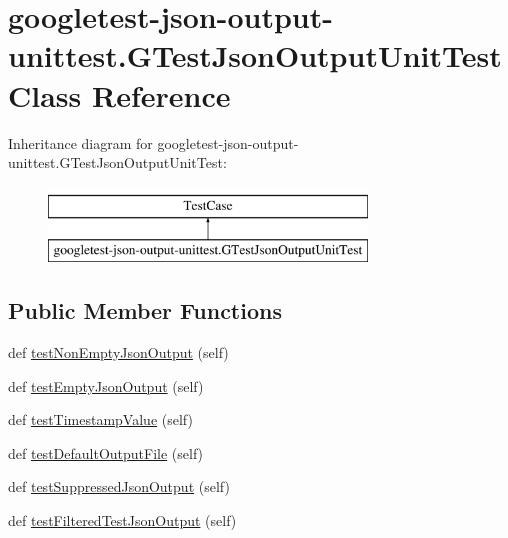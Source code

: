 \hypertarget{classgoogletest-json-output-unittest_1_1GTestJsonOutputUnitTest}{}\section{googletest-\/json-\/output-\/unittest.G\+Test\+Json\+Output\+Unit\+Test Class Reference}
\label{classgoogletest-json-output-unittest_1_1GTestJsonOutputUnitTest}
Inheritance diagram for googletest-\/json-\/output-\/unittest.G\+Test\+Json\+Output\+Unit\+Test\+:\begin{figure}[H]
\begin{center}
\leavevmode
\includegraphics[height=2.000000cm]{classgoogletest-json-output-unittest_1_1GTestJsonOutputUnitTest}
\end{center}
\end{figure}
\subsection*{Public Member Functions}
\begin{DoxyCompactItemize}
\item 
def \mbox{\hyperlink{classgoogletest-json-output-unittest_1_1GTestJsonOutputUnitTest_ab5520f22133356e62a54cdb5756504bc}{test\+Non\+Empty\+Json\+Output}} (self)
\item 
def \mbox{\hyperlink{classgoogletest-json-output-unittest_1_1GTestJsonOutputUnitTest_ad8f3712a87e4c54bb475103793975482}{test\+Empty\+Json\+Output}} (self)
\item 
def \mbox{\hyperlink{classgoogletest-json-output-unittest_1_1GTestJsonOutputUnitTest_afceaa6545170996b286e610e31f2e403}{test\+Timestamp\+Value}} (self)
\item 
def \mbox{\hyperlink{classgoogletest-json-output-unittest_1_1GTestJsonOutputUnitTest_a6003d1c583fc2ded1ab5276fc82cb1c9}{test\+Default\+Output\+File}} (self)
\item 
def \mbox{\hyperlink{classgoogletest-json-output-unittest_1_1GTestJsonOutputUnitTest_aeae00520b90ff69e832cf6a676219cf8}{test\+Suppressed\+Json\+Output}} (self)
\item 
def \mbox{\hyperlink{classgoogletest-json-output-unittest_1_1GTestJsonOutputUnitTest_abc55ae0ca4d9b3d265b10bbbcc6e720e}{test\+Filtered\+Test\+Json\+Output}} (self)
\end{DoxyCompactItemize}



